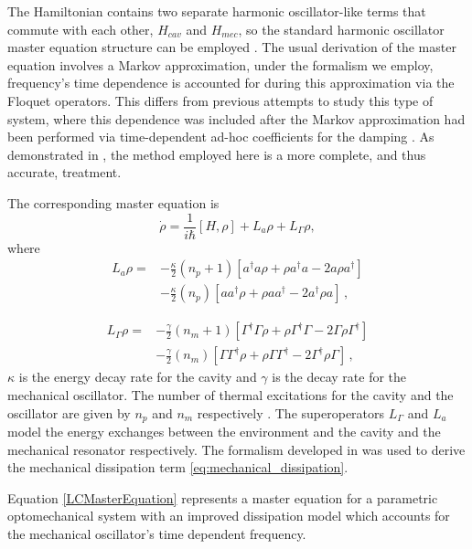 \documentclass[reprint, amsmath,amssymb, aps,pra]{revtex4-1}
\begin{document}
The Hamiltonian contains two separate harmonic oscillator-like terms
that commute with each other, $H_{cav}$ and $H_{mec}$, so the standard
harmonic oscillator master equation structure can be employed
\cite{TesisMaestria}\cite{HanngiFM}. The usual derivation of the master
equation involves a Markov approximation, under the formalism we
employ, frequency's time dependence is accounted for during this
approximation \cite{HanngiFM} via the Floquet operators. This differs
from previous attempts to study this type of system, where this
dependence was included after the Markov approximation had been
performed via time-dependent ad-hoc coefficients for the damping
\cite{BarberisLC}. As demonstrated in \cite{HanngiFM}, the method
employed here is a more complete, and thus accurate, treatment.

The corresponding master equation is
\begin{equation} \label{LCMasterEquation}
\dot{\rho} = \frac{1}{i\hbar}[H,\rho] +L_a\rho + L_\Gamma \rho,
\end{equation}
where
\begin{align}
L_a \rho =& - \frac{\kappa}{2}(n_p + 1)[a^\dagger a\rho + \rho a^\dagger a -2a\rho a^\dagger]  \\
 &- \frac{\kappa}{2}(n_p)[ aa^\dagger\rho + \rho  aa^\dagger -2a^\dagger\rho a]\, ,\nonumber
\end{align}

\begin{align}\label{eq:mechanical_dissipation}
  L_\Gamma \rho =& - \frac{\gamma}{2}(n_m + 1)[\Gamma^\dagger \Gamma\rho + \rho \Gamma^\dagger \Gamma -2\Gamma\rho \Gamma^\dagger]  \\
                 &- \frac{\gamma}{2}(n_m)[ \Gamma\Gamma^\dagger\rho + \rho  \Gamma\Gamma^\dagger -2\Gamma^\dagger\rho \Gamma]\, ,\nonumber
\end{align} 
$\kappa$ is the energy decay rate for the cavity and $\gamma$ is the
decay rate for the mechanical oscillator. The number of thermal
excitations for the cavity and the oscillator are given by $n_p$ and
$n_m$ respectively \cite{EnglertFL}. The superoperators $L_\Gamma$ and
$L_a$ model the energy exchanges between the environment and the
cavity and the mechanical resonator respectively. The formalism
developed in \cite{HanngiFM} was used to derive the mechanical
dissipation term \eqref{eq:mechanical_dissipation}.

Equation \eqref{LCMasterEquation} represents a master equation for a
parametric optomechanical system with an improved dissipation model
which accounts for the mechanical oscillator's time dependent
frequency.
\end{document}
